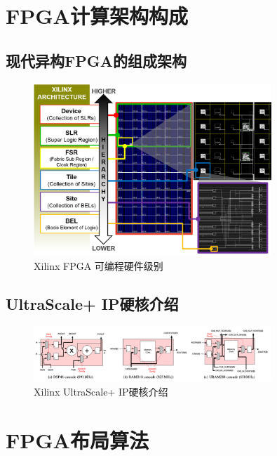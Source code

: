 \section{FPGA计算架构构成}


\subsection{现代异构FPGA的组成架构}

\begin{figure}[h]
	\centering
	\includegraphics[width=0.8\textwidth]{figure/hierarchy}
	\caption{Xilinx FPGA 可编程硬件级别} 
	\label{fig:hierarchy}
\end{figure}

\subsection{UltraScale+ IP硬核介绍}

\begin{figure}[h]
	\centering
	\includegraphics[width=0.8\textwidth]{figure/hardblocks}
	\caption{Xilinx UltraScale+ IP硬核介绍} 
	\label{fig:hardblocks}
\end{figure}

\section{FPGA布局算法}


